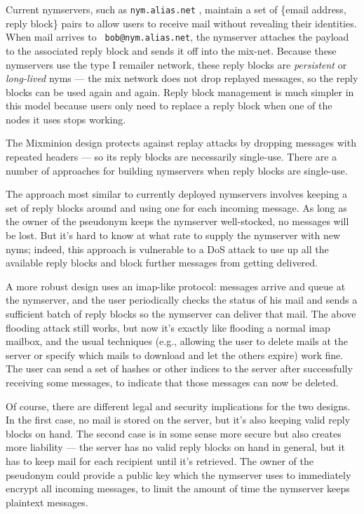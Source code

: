 \documentclass{llncs}
\begin{document}
{Current nymservers, such as {\tt nym.alias.net} \cite{nym-alias-net},
maintain a set of \{email address, reply block\} pairs to allow users to
receive mail without revealing their identities. When mail arrives to {\tt
bob@nym.alias.net}, the nymserver attaches the payload to the associated
reply block and sends it off into the mix-net. Because these nymservers
use the type I remailer network, these reply blocks are \emph{persistent}
or \emph{long-lived} nyms --- the mix network does not drop replayed
messages, so the reply blocks can be used again and again. Reply block
management is much simpler in this model because users only need to
replace a reply block when one of the nodes it uses stops working.

The Mixminion design protects against replay attacks by dropping
messages with repeated headers --- so its reply blocks are necessarily
single-use. There are a number of approaches for building nymservers
when reply blocks are single-use.

The approach most similar to currently deployed nymservers involves
keeping a set of reply blocks around and using one for each incoming
message. As long as the owner of the pseudonym keeps the nymserver
well-stocked, no messages will be lost. But it's hard to know at what
rate to supply the nymserver with new nyms; indeed, this approach is
vulnerable to a DoS attack to use up all the available reply blocks and
block further messages from getting delivered.

A more robust design uses an imap-like protocol: messages arrive and queue
at the nymserver, and the user periodically checks the status of his mail
and sends a sufficient batch of reply blocks so the nymserver can deliver
that mail. The above flooding attack still works, but now it's exactly
like flooding a normal imap mailbox, and the usual techniques (e.g.,
allowing the user to delete mails at the server or specify which mails to
download and let the others expire) work fine. The user can send a set
of hashes or other indices to the server after successfully receiving
some messages, to indicate that those messages can now be deleted.

Of course, there are different legal and security implications for the two
designs. In the first case, no mail is stored on the server, but it's also
keeping valid reply blocks on hand. The second case is in some sense more
secure but also creates more liability --- the server has no valid reply
blocks on hand in general, but it has to keep mail for each recipient
until it's retrieved. The owner of the pseudonym could provide a public
key which the nymserver uses to immediately encrypt all incoming messages,
to limit the amount of time the nymserver keeps plaintext messages.

}
\end{document}
